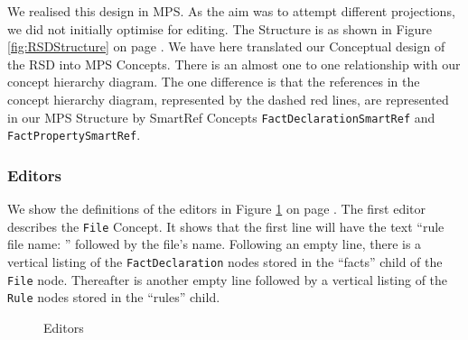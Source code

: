 We realised this design in MPS.
As the aim was to attempt different projections, we did not initially optimise for editing.
The Structure is as shown in Figure \ref{fig:RSDStructure} on page \pageref{fig:RSDStructure}.
We have here translated our Conceptual design of the RSD into MPS Concepts.
There is an almost one to one relationship with our concept hierarchy diagram.
The one difference is that the references in the concept hierarchy diagram, represented by the dashed red lines, are represented in our MPS Structure by SmartRef Concepts \texttt{FactDeclarationSmartRef} and \texttt{FactPropertySmartRef}.


\subsubsection{Editors}

We show the definitions of the editors in Figure \ref{fig:RSDEditors} on page \pageref{fig:RSDEditors}. 
The first editor describes the \texttt{File} Concept. 
It shows that the first line will have the text ``rule file name: '' followed by the file's name.
Following an empty line, there is a vertical listing of the \texttt{FactDeclaration} nodes stored in the ``facts'' child of the \texttt{File} node.
Thereafter is another empty line followed by a vertical listing of the \texttt{Rule} nodes stored in the ``rules'' child.

\begin{figure}[htbp]
    \centering
    \caption{Editors}
    \label{fig:RSDEditors}
\end{figure}

